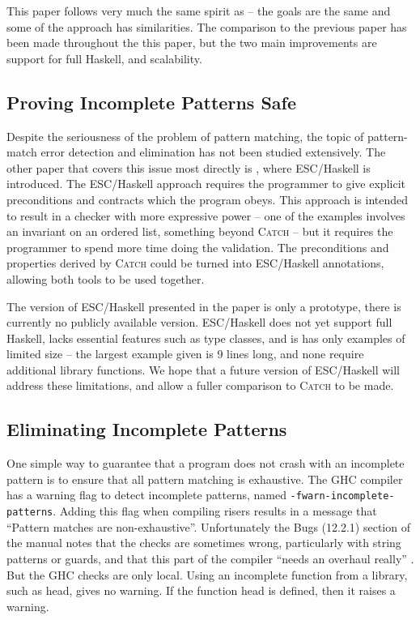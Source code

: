 \documentclass[preprint]{sigplanconf}
\let\cite=\citep
\newcommand{\T}[1]{\texttt{#1}}
\newcommand{\C}[1]{\textsf{#1}}
\newcommand{\catch}{\textsc{Catch}}
\begin{document}
This paper follows very much the same spirit as \cite{me:catch_tfp} -- the goals are the same and some of the approach has similarities. The comparison to the previous paper has been made throughout the this paper, but the two main improvements are support for full Haskell, and scalability.

\subsection{Proving Incomplete Patterns Safe}

Despite the seriousness of the problem of pattern matching, the topic of pattern-match error detection and elimination has not been studied extensively. The other paper that covers this issue most directly is \citep{esc_haskell}, where ESC/Haskell is introduced. The ESC/Haskell approach requires the programmer to give explicit preconditions and contracts which the program obeys. This approach is intended to result in a checker with more expressive power -- one of the examples involves an invariant on an ordered list, something beyond \catch{} -- but it requires the programmer to spend more time doing the validation. The preconditions and properties derived by \catch{} could be turned into ESC/Haskell annotations, allowing both tools to be used together.

The version of ESC/Haskell presented in the paper is only a prototype, there is currently no publicly available version. ESC/Haskell does not yet support full Haskell, lacks essential features such as type classes, and is has only examples of limited size -- the largest example given is 9 lines long, and none require additional library functions. We hope that a future version of ESC/Haskell will address these limitations, and allow a fuller comparison to \catch{} to be made.


\subsection{Eliminating Incomplete Patterns}

One simple way to guarantee that a program does not crash with an incomplete pattern is to ensure that all pattern matching is exhaustive. The GHC compiler \citep{ghc} has a warning flag to detect incomplete patterns, named \T{-fwarn-incomplete-patterns}. Adding this flag when compiling risers results in a message that ``Pattern matches are non-exhaustive''. Unfortunately the Bugs (12.2.1) section of the manual notes that the checks are sometimes wrong, particularly with string patterns or guards, and that this part of the compiler ``needs an overhaul really'' \citep{ghc_manual}. But the GHC checks are only local. Using an incomplete function from a library, such as \C{head}, gives no warning. If the function \C{head} is defined, then it raises a warning.
\end{document}
